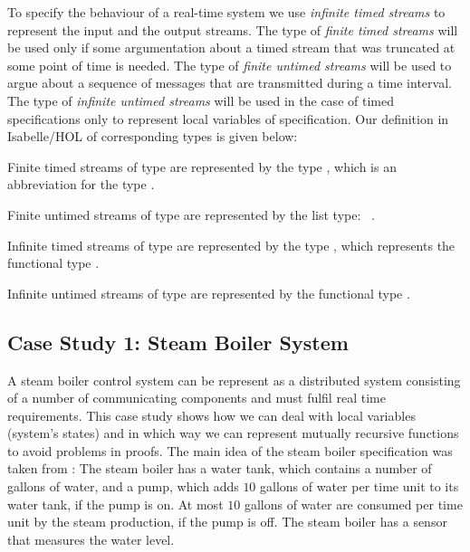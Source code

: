 To specify the behaviour of a real-time system we  use 
\emph{infinite timed streams} to represent the input and the output streams. 
The type of \emph{finite timed streams} will be used  
only if some argumentation about a timed stream that was truncated 
at some point of time is needed. 
The type of \emph{finite untimed streams} will be used to argue about a sequence of messages 
that are transmitted during a time interval.
The type of \emph{infinite untimed streams} will be used in the case of timed specifications 
only to represent local variables of \Focus specification.
Our definition in Isabelle/HOL of corresponding types is given below: 
%
\begin{itemize*}
%
\item 
Finite timed streams of type   are represented by the type ,  
which is an abbreviation for the type .
%
\item 
Finite untimed streams of type   are represented by the list type:~
.
%
\item 
Infinite timed streams of type   are represented by the type ,  
which represents the functional type .
%
\item 
Infinite untimed streams of type   are represented by 
the functional type .
%
\end{itemize*}
%
 

\subsection{Case Study 1: Steam Boiler System}

A steam boiler control system  can be represent as a distributed system 
consisting of a number of communicating components and must fulfil real time requirements. 
This case study shows how we can deal with local variables (system's states) and 
in which way we can represent mutually recursive functions to avoid problems in proofs.  
The main idea of the steam boiler specification was taken from \cite{focus}: 
The steam boiler has a water tank, which contains a number of gallons of water, and
a pump, which adds $10$ gallons of water per time unit to its water tank, 
if the pump is on. At most $10$ gallons of water are consumed per time unit by
the steam production, if the pump is off.
The steam boiler has a sensor that measures the water level. 

